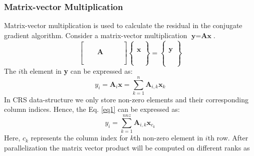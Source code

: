 \documentclass[sigplan,screen]{acmart}
\begin{document}
\subsubsection{Matrix-vector Multiplication}\label{mpi}
Matrix-vector multiplication is used to calculate the residual in the conjugate gradient algorithm. Consider a matrix-vector multiplication $\textbf{y}=\textbf{Ax}$. 
\begin{equation*}
\begin{bmatrix}
& & & & & \\
& & & & & \\
& & \mathbf{A}& & & \\
& & & & & \\
& & & & & \\
& & & & & 
\end{bmatrix}
\begin{Bmatrix}
\\
\\
\mathbf{x}\\
\\
\\
\\	
\end{Bmatrix}
= \begin{Bmatrix}
\\
\\
\mathbf{y}\\
\\
\\
\\	
\end{Bmatrix} 
\end{equation*}
The $i$th element in \textbf{y} can be expressed as:
\begin{equation}\label{eq1}
y_i= \textbf{A}_i\textbf{x}=\sum_{k=1}^{n}\textbf{A}_{i,k}\textbf{x}_k
\end{equation}
In CRS data-structure we only store non-zero elements and their corresponding column indices. Hence, the Eq. \ref{eq1} can be expressed as:
\begin{equation}
y_i = \sum_{k=1}^{nnz}\textbf{A}_{i,k}\textbf{x}_{c_k}
\end{equation}
Here, $c_k$ represents the column index for $k$th non-zero element in $i$th row. After parallelization the matrix vector product will be computed on different ranks as
\end{document}
